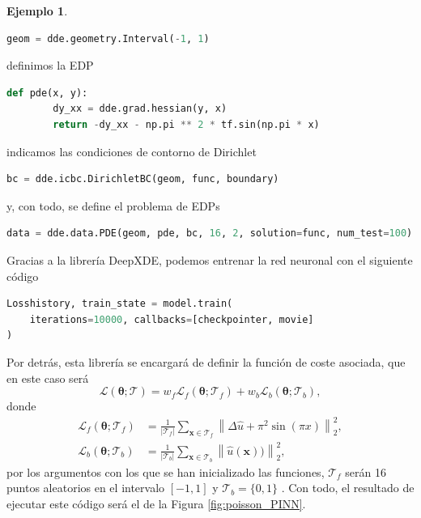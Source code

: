\documentclass[a4paper,11pt,spanish, twoside, leqno]{tfg-uam}
\theoremstyle{definition}
\newtheorem{exmp}[teor]{Ejemplo}
\begin{document}
\begin{mdframed}
\begin{exmp}
\begin{lstlisting}[language=Python]
    geom = dde.geometry.Interval(-1, 1)
\end{lstlisting}
        definimos la EDP
\begin{lstlisting}[language=Python]
    def pde(x, y):
        dy_xx = dde.grad.hessian(y, x)
        return -dy_xx - np.pi ** 2 * tf.sin(np.pi * x)
\end{lstlisting}
    indicamos las condiciones de contorno de Dirichlet
\begin{lstlisting}[language=Python]
    bc = dde.icbc.DirichletBC(geom, func, boundary)
\end{lstlisting}
y, con todo, se define el problema de EDPs
\begin{lstlisting}[language=Python]
   data = dde.data.PDE(geom, pde, bc, 16, 2, solution=func, num_test=100)
\end{lstlisting}
    Gracias a la librería DeepXDE, podemos entrenar la red neuronal con el siguiente código
\begin{lstlisting}[language=Python]
Losshistory, train_state = model.train(
    iterations=10000, callbacks=[checkpointer, movie]
)
\end{lstlisting}
    Por detrás, esta librería se encargará de definir la función de coste asociada, que en este caso será
    \begin{equation*} 
        \mathcal{L}(\boldsymbol{\theta}; \mathcal{T}) = w_f \mathcal{L}_f(\boldsymbol{\theta}; \mathcal{T}_f) + w_b \mathcal{L}_b(\boldsymbol{\theta}; \mathcal{T}_b),
    \end{equation*}
    donde
    \begin{align*}
        \mathcal{L}_f(\boldsymbol{\theta}; \mathcal{T}_f) &= \frac{1}{|\mathcal{T}_f|} \sum_{\mathbf{x} \in \mathcal{T}_f} \left\| \Delta \hat{u} +\pi^2 \sin(\pi x)\right\|_2^2, \\ 
        \mathcal{L}_b(\boldsymbol{\theta}; \mathcal{T}_b) &= \frac{1}{|\mathcal{T}_b|} \sum_{\mathbf{x} \in \mathcal{T}_b} \left\| \hat{u} (\mathbf{x}))\right\|_2^2,
    \end{align*}
    por los argumentos con los que se han inicializado las funciones, $\mathcal{T}_f$ serán 16 puntos aleatorios en el intervalo $[-1,1]$ y $\mathcal{T}_b = \{0,1\}$ . Con todo, el resultado de ejecutar este código será el de la Figura \ref{fig:poisson_PINN}.


\end{exmp}
\end{mdframed}
\end{document}
